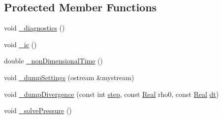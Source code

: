 \subsection*{Protected Member Functions}
\begin{DoxyCompactItemize}
\item 
void \hyperlink{class_sim___f_s_i___gravity_a0eb1be561cbc294534d7598b736515f0}{\+\_\+diagnostics} ()
\item 
void \hyperlink{class_sim___f_s_i___gravity_af85ffd4ea8c6745eaecf72093186473e}{\+\_\+ic} ()
\item 
double \hyperlink{class_sim___f_s_i___gravity_a3b3fb225cb6b06da61bfbb848f9be268}{\+\_\+non\+Dimensional\+Time} ()
\item 
void \hyperlink{class_sim___f_s_i___gravity_a1c0403f8126998a080e154a0d4cdbe92}{\+\_\+dump\+Settings} (ostream \&mystream)
\item 
void \hyperlink{class_sim___f_s_i___gravity_a6825457adf9b31ba9da6bc6056263852}{\+\_\+dump\+Divergence} (const int \hyperlink{class_simulation___fluid_a413104a68456556da195430ec33aa885}{step}, const \hyperlink{_h_d_f5_dumper_8h_a445a5f0e2a34c9d97d69a3c2d1957907}{Real} rho0, const \hyperlink{_h_d_f5_dumper_8h_a445a5f0e2a34c9d97d69a3c2d1957907}{Real} \hyperlink{class_simulation___fluid_ad7aa765d258a0ba11c46893884960173}{dt})
\item 
void \hyperlink{class_sim___f_s_i___gravity_a3bda0222882a28818ad1ecdfcf3e4ec2}{\+\_\+solve\+Pressure} ()
\end{DoxyCompactItemize}
